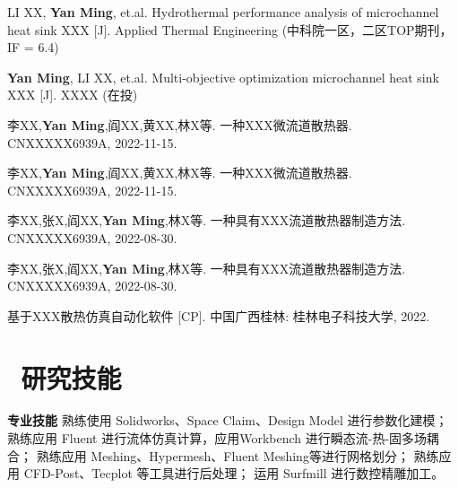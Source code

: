 \documentclass[a4paper,11pt]{ctexart}
\begin{document}
\resumeSubHeadingListStart

  \resumeResearchResultsListStart
    \item LI XX, \textbf{Yan Ming}, et.al. Hydrothermal performance analysis of microchannel heat sink XXX [J]. Applied Thermal Engineering (中科院一区，二区TOP期刊，IF = 6.4)
    \item \textbf{Yan Ming}, LI XX, et.al. Multi-objective optimization microchannel heat sink XXX [J]. XXXX (在投)
  \resumeResearchResultsListEnd

  \vspace{-1mm}

  \resumeResearchResultsListStart
    \item 李XX,\textbf{Yan Ming},阎XX,黄XX,林X等. 一种XXX微流道散热器. CNXXXXX6939A, 2022-11-15.
    \item 李XX,\textbf{Yan Ming},阎XX,黄XX,林X等. 一种XXX微流道散热器. CNXXXXX6939A, 2022-11-15.
    \item 李XX,张X,阎XX,\textbf{Yan Ming},林X等. 一种具有XXX流道散热器制造方法. CNXXXXX6939A, 2022-08-30.
    \item 李XX,张X,阎XX,\textbf{Yan Ming},林X等. 一种具有XXX流道散热器制造方法. CNXXXXX6939A, 2022-08-30.
  \resumeResearchResultsListEnd

  \vspace{-1mm}

  \resumeResearchResultsListStart
    \item 基于XXX散热仿真自动化软件 [CP]. 中国广西桂林: 桂林电子科技大学, 2022.
  \resumeResearchResultsListEnd

\resumeSubHeadingListEnd

\vspace{-7.5mm}

\section{\texorpdfstring{\faWrench\,}{} 研究技能}
\resumeSubHeadingListStart

  \item \enspace\textbf{专业技能}\vspace{-2.4mm}
  \resumeItemListStart
    {熟练使用 Solidworks、Space Claim、Design Model 进行参数化建模；}
    {熟练应用 Fluent 进行流体仿真计算，应用Workbench 进行瞬态流-热-固多场耦合；}
    {熟练应用 Meshing、Hypermesh、Fluent Meshing等进行网格划分；}
    {熟练应用 CFD-Post、Tecplot 等工具进行后处理；}
    {运用 Surfmill 进行数控精雕加工。}
  \resumeItemListEnd
\end{document}
